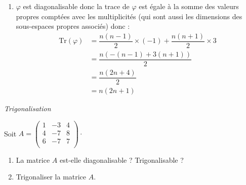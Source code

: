 \documentclass[a4paper,10pt]{report}
\begin{document}
\begin{enumerate}
\item $\varphi$ est diagonalisable donc la trace de $\varphi$ est égale à la somme des valeurs propres comptées avec les multiplicités (qui sont aussi les dimensions des sous-espaces propres associés) donc :
\begin{align*}
\textrm{Tr}(\varphi)& = \dfrac{n(n-1)}{2} \times (-1) + \dfrac{n(n+1)}{2} \times 3  \\
& = \dfrac{n(-(n-1)+3(n+1))}{2} \\
& = \dfrac{n(2n+4)}{2} \\
& = n(2n+1) 
\end{align*}
\end{enumerate}



\medskip

\begin{center}
\textit{{ {\large Trigonalisation}}}
\end{center}

\medskip

\begin{Exa} Soit $A= \begin{pmatrix}
1 & -3 & 4 \\
4 & -7 & 8 \\
6 & -7 & 7 \\
\end{pmatrix}\cdot$

\begin{enumerate}
\item La matrice $A$ est-elle diagonalisable ? Trigonalisable ?
\item Trigonaliser la matrice $A$. 
\end{enumerate}
\end{Exa}

\corr 
\end{document}
